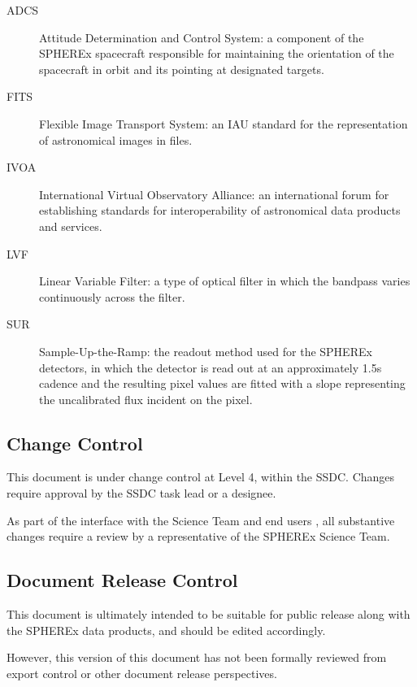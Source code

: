 \documentclass[DP]{spherex}
\begin{document}
\begin{description}
  \item[ADCS]  Attitude Determination and Control System: a component of
    the SPHEREx spacecraft responsible for maintaining the orientation of
    the spacecraft in orbit and its pointing at designated targets.
  \item[FITS]  Flexible Image Transport System: an IAU standard for the
    representation of astronomical images in files.
  \item[IVOA]  International Virtual Observatory Alliance: an international
    forum for establishing standards for interoperability of astronomical
    data products and services.
  \item[LVF]   Linear Variable Filter: a type of optical filter in which the
    bandpass varies continuously across the filter.
  \item[SUR]   Sample-Up-the-Ramp: the readout method used for the SPHEREx
    detectors, in which the detector is read out at an approximately 1.5s
    cadence and the resulting pixel values are fitted with a slope
    representing the uncalibrated flux incident on the pixel.
\end{description}

\subsection{Change Control}


This document is under change control at Level 4, within the SSDC.
Changes require approval by the SSDC task lead or a designee.

As part of the interface with the Science Team
and end users%
, all substantive changes require a review by a representative of
the SPHEREx Science Team.

\subsection{Document Release Control}


This document is ultimately intended to be suitable for public release along
with the SPHEREx data products, and should be edited accordingly.

However, this version of this document has not been formally reviewed from
export control or other document release perspectives.
\end{document}
